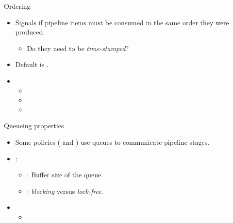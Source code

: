 \begin{frame}[t]{Ordering}
\begin{itemize}
  \item Signals if pipeline items must be consumed in the same order they were produced.
    \begin{itemize}
      \item Do they need to be \emph{time-stamped}?
    \end{itemize}

  \vfill
  \item Default is .

  \vfill
  \item {}
    \begin{itemize}
      \item {}
      \item {}
      \item {} 
    \end{itemize}
\end{itemize}
\end{frame}

\begin{frame}[t]{Queueing properties}
\begin{itemize}
  \item Some policies ( and ) use queues to
        communicate pipeline stages.

  \vfill
  \item {}:
    \begin{itemize}
      \item {}: Buffer size of the queue.
      \item {}: \emph{blocking} versus \emph{lock-free}.
    \end{itemize}

  \vfill
  \item {}
    \begin{itemize}
      \item {}
    \end{itemize}
\end{itemize}
\end{frame}
